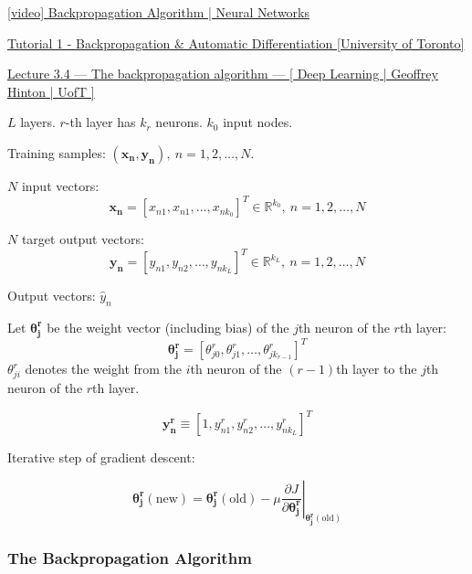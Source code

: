 \documentclass{article}
\begin{document}
\begin{multicols}{2}
\begin{mdframed}
	\href{https://www.youtube.com/watch?v=sIX\_9n-1UbM}{[video] Backpropagation Algorithm | Neural Networks}

	\href{https://www.cs.toronto.edu/~rgrosse/courses/csc2541\_2022/tutorials/tut01.pdf}{Tutorial 1 - Backpropagation \& Automatic Differentiation [University of Toronto]}

	\href{https://www.youtube.com/watch?v=VCT1N0EsGj0&list=PLLssT5z\_DsK\_gyrQ\_biidwvPYCRNGI3iv&index=14}{Lecture 3.4 — The backpropagation algorithm — [ Deep Learning | Geoffrey Hinton | UofT ]}
\end{mdframed}

$L$ layers.
$r$-th layer has $k_r$ neurons.
$k_0$ input nodes.

Training samples: $(\symbf{x_n}, \symbf{y_n}),\ n=1, 2, \ldots, N$.

$N$ input vectors:
\[\symbf{x_n} = [x_{n 1}, x_{n 1}, \ldots , x_{n k_0}]^T \in \mathbb{R}^{k_0},\ n = 1, 2, \ldots, N\]

$N$ target output vectors:
\[\symbf{y_n} = [y_{n 1}, y_{n 2}, \ldots , y_{n k_L}]^T \in \mathbb{R}^{k_L},\ n = 1, 2, \ldots, N\]

Output vectors: $\hat y_n$

Let $\symbf{\theta_j^r}$ be the weight vector (including bias) of the $j$th neuron of the $r$th layer:
\[\symbf{\theta_j^r} = [\theta_{j0}^r, \theta_{j1}^r, \ldots, \theta_{jk_{r-1}}^r]^T\]
$\theta_{ji}^r$ denotes the weight from the $i$th neuron of the $(r-1)$th layer to the $j$th neuron of the $r$th layer.

\[\symbf{y_n^r} \equiv [1, y_{n 1}^r, y_{n 2}^r, \ldots, y_{n k_L}^r]^T\]

Iterative step of gradient descent:

\[\symbf{\theta_j^r}(\text{new}) = \symbf{\theta_j^r}(\text{old}) - \mu \left.\frac{\partial J}{\partial \symbf{\theta_j^r}} \right|_{\symbf{\theta_j^r}(\text{old})}\]

\subsubsection*{The Backpropagation Algorithm}


\end{multicols}
\end{document}
